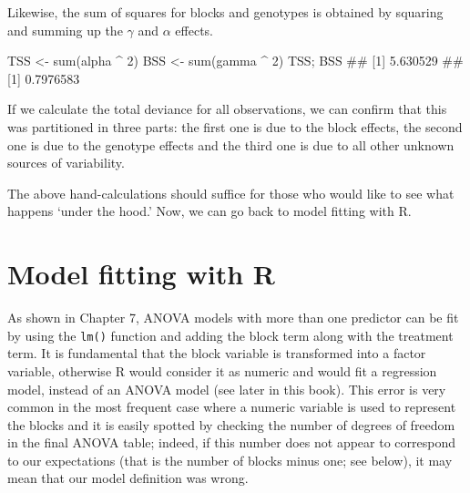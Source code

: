 \documentclass[a4paper,12pt,oneside]{book}
\newenvironment{Shaded}{\begin{snugshade}}{\end{snugshade}}
\newcommand{\DecValTok}[1]{#1}
\newcommand{\SpecialCharTok}[1]{#1}
\newcommand{\DocumentationTok}[1]{#1}
\newcommand{\OtherTok}[1]{#1}
\newcommand{\FunctionTok}[1]{#1}
\newcommand{\NormalTok}[1]{#1}
\begin{document}
Likewise, the sum of squares for blocks and genotypes is obtained by squaring and summing up the \(\gamma\) and \(\alpha\) effects.

\vspace{12pt}

\begin{Shaded}
\begin{Highlighting}[]
\NormalTok{TSS }\OtherTok{\textless{}{-}} \FunctionTok{sum}\NormalTok{(alpha }\SpecialCharTok{\^{}} \DecValTok{2}\NormalTok{)}
\NormalTok{BSS }\OtherTok{\textless{}{-}} \FunctionTok{sum}\NormalTok{(gamma }\SpecialCharTok{\^{}} \DecValTok{2}\NormalTok{)}
\NormalTok{TSS; BSS}
\DocumentationTok{\#\# [1] 5.630529}
\DocumentationTok{\#\# [1] 0.7976583}
\end{Highlighting}
\end{Shaded}

If we calculate the total deviance for all observations, we can confirm that this was partitioned in three parts: the first one is due to the block effects, the second one is due to the genotype effects and the third one is due to all other unknown sources of variability.

\vspace{12pt}

\begin{Shaded}
\end{Shaded}

The above hand-calculations should suffice for those who would like to see what happens `under the hood.' Now, we can go back to model fitting with R.

\hypertarget{model-fitting-with-r}{%
\section{Model fitting with R}\label{model-fitting-with-r}}

As shown in Chapter 7, ANOVA models with more than one predictor can be fit by using the \texttt{lm()} function and adding the block term along with the treatment term. It is fundamental that the block variable is transformed into a factor variable, otherwise R would consider it as numeric and would fit a regression model, instead of an ANOVA model (see later in this book). This error is very common in the most frequent case where a numeric variable is used to represent the blocks and it is easily spotted by checking the number of degrees of freedom in the final ANOVA table; indeed, if this number does not appear to correspond to our expectations (that is the number of blocks minus one; see below), it may mean that our model definition was wrong.
\end{document}

